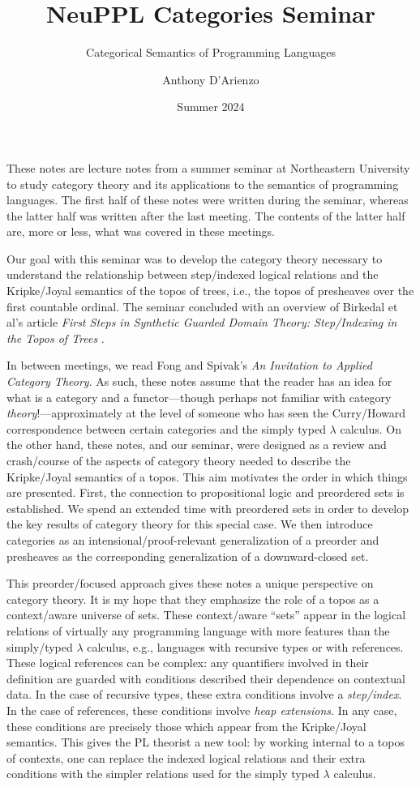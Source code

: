 \documentclass{./thesis-note}
\subtitle{Categorical Semantics of Programming Languages}
\title{\color{NortheasternRed} NeuPPL Categories Seminar}
\author{Anthony D'Arienzo}
\date{Summer 2024}
\begin{document}
\doublespacing%
\vspace{\fill}
\makehomeworktitle%
\onehalfspacing%
\vspace{0.1\paperheight}

These notes are lecture notes from a summer seminar at
Northeastern University to study category theory and its applications
to the semantics of programming languages. The first half of these
notes were written during the seminar, whereas the latter half was
written after the last meeting. The contents of the latter half are,
more or less, what was covered in these meetings.

Our goal with this seminar was to develop the category theory
necessary to understand the relationship between step\-/indexed
logical relations and the Kripke\-/Joyal semantics of the topos of
trees, i.e., the topos of presheaves over the first countable
ordinal. The seminar concluded with an overview of Birkedal et al's
article \emph{First Steps in Synthetic Guarded Domain Theory:
  Step\-/Indexing in the Topos of Trees} \cite{5970227}.

In between meetings, we read Fong and Spivak's \emph{An Invitation to
  Applied Category Theory}\linebreak\cite{Fong2019}. As such, these
notes assume that the reader has an idea for what is a category and a
functor---though perhaps not familiar with category
\emph{theory}!---approximately at the level of someone who has seen
the Curry\-/Howard correspondence between certain categories and the
simply typed \(\lambda\) calculus. On the other hand, these notes, and
our seminar, were designed as a review and crash\-/course of the
aspects of category theory needed to describe the Kripke\-/Joyal
semantics of a topos. This aim motivates the order in which things are
presented. First, the connection to propositional logic and preordered
sets is established. We spend an extended time with preordered sets in
order to develop the key results of category theory for this special
case. We then introduce categories as an intensional/proof-relevant
generalization of a preorder and presheaves as the corresponding
generalization of a downward-closed set.

This preorder\-/focused approach gives these notes a unique
perspective on category theory. It is my hope that they emphasize the
role of a topos as a context\-/aware universe of sets. These
context\-/aware ``sets'' appear in the logical relations of virtually
any programming language with more features than the simply\-/typed
\(\lambda\) calculus, e.g., languages with recursive types or with
references. These logical references can be complex: any quantifiers
involved in their definition are guarded with conditions described
their dependence on contextual data. In the case of recursive types,
these extra conditions involve a \emph{step\-/index}. In the case of
references, these conditions involve \emph{heap extensions}. In any
case, these conditions are precisely those which appear from the
Kripke\-/Joyal semantics. This gives the PL theorist a new tool: by
working internal to a topos of contexts, one can replace the indexed
logical relations and their extra conditions with the simpler
relations used for the simply typed \(\lambda\) calculus.
\end{document}
